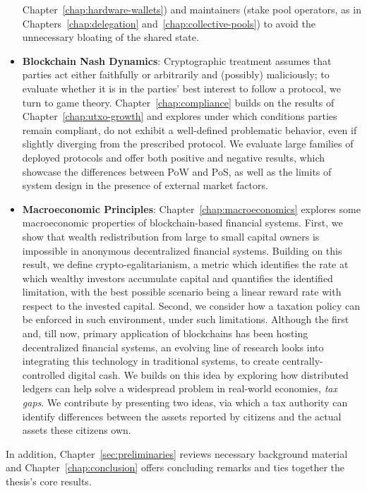 \begin{itemize}
        Chapter~\ref{chap:hardware-wallets}) and maintainers (\eg stake pool
        operators, as in Chapters~\ref{chap:delegation}
        and~\ref{chap:collective-pools}) to avoid the unnecessary bloating of the
        shared state.
    \item \textbf{Blockchain Nash Dynamics}:
        Cryptographic treatment assumes that parties act either faithfully or
        arbitrarily and (possibly) maliciously; to evaluate whether it is in
        the parties' best interest to follow a protocol, we turn to game
        theory. Chapter~\ref{chap:compliance} builds on the results of
        Chapter~\ref{chap:utxo-growth} and explores under which conditions
        parties remain compliant, \ie do not exhibit a well-defined problematic
        behavior, even if slightly diverging from the prescribed protocol. We
        evaluate large families of deployed protocols and offer both positive
        and negative results, which showcase the differences between PoW and
        PoS, as well as the limits of system design in the presence of external
        market factors.
    \item \textbf{Macroeconomic Principles}:
        Chapter~\ref{chap:macroeconomics} explores some macroeconomic properties of
        blockchain-based financial systems. First, we show that wealth redistribution from large to
        small capital owners is impossible in anonymous decentralized financial
        systems. Building on this result, we define crypto-egalitarianism, a
        metric which identifies the rate at which wealthy investors accumulate
        capital and quantifies the identified limitation, with the best
        possible scenario being a linear reward rate with respect to the
        invested capital.
        Second, we consider how a taxation policy can be enforced in such
        environment, under such limitations. Although the first and, till now,
        primary application of blockchains has been hosting decentralized
        financial systems, an evolving line of research looks into integrating
        this technology in traditional systems, to create centrally-controlled
        digital cash.  We builds on this idea by exploring how distributed
        ledgers can help solve a widespread problem in real-world economies,
        \emph{tax gaps}. We contribute by presenting two ideas, via which a tax
        authority can identify differences between the assets reported by
        citizens and the actual assets these citizens own.
\end{itemize}

In addition, Chapter~\ref{sec:preliminaries} reviews necessary
background material and Chapter~\ref{chap:conclusion} offers concluding remarks
and ties together the thesis's core results.
